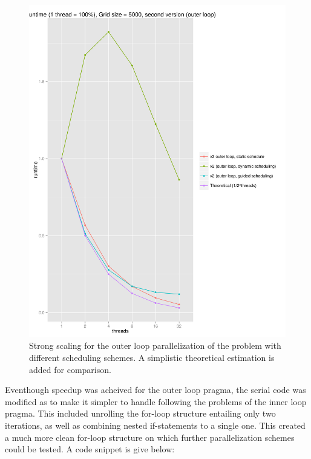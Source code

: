 \documentclass[12pt]{article}
\begin{document}
\begin{figure}[]
	\centering
	\includegraphics[scale=0.5]{plot2}
	\caption{Strong scaling for the outer loop parallelization of the problem with different scheduling schemes. A simplistic theoretical estimation is added for comparison.}
	\label{fig:plot1}
\end{figure}

Eventhough speedup was acheived for the outer loop pragma, the serial code was modified as to make it simpler to handle following the problems of the inner loop pragma. This included unrolling the for-loop structure entailing only two iterations, as well as combining nested if-statements to a single one. This created a much more clean for-loop structure on which further parallelization schemes could be tested. A code snippet is give below:
\end{document}
